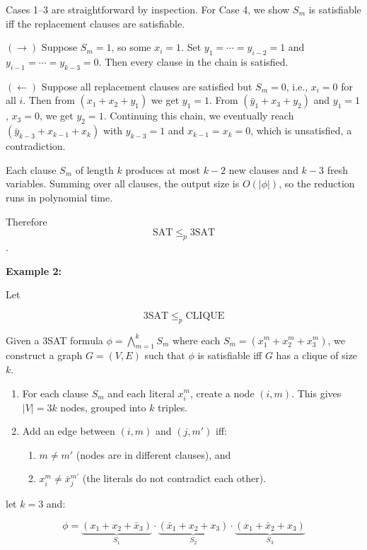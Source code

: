 \documentclass[12pt,a4paper,openany]{article}
\begin{document}
Cases 1--3 are straightforward by inspection. For Case 4, we show $S_m$ is satisfiable iff the replacement clauses are satisfiable.

$(\to)$ Suppose $S_m = 1$, so some $x_i = 1$. Set $y_1 = \cdots = y_{i-2} = 1$ and
$y_{i-1} = \cdots = y_{k-3} = 0$. Then every clause in the chain is satisfied.

$(\leftarrow)$ Suppose all replacement clauses are satisfied but $S_m = 0$, i.e., $x_i = 0$ for
all $i$. Then from $(x_1 + x_2 + y_1)$ we get $y_1 = 1$. From $(\bar{y}_1 + x_3 + y_2)$
and $y_1 = 1$, $x_3 = 0$, we get $y_2 = 1$. Continuing this chain, we eventually reach
$(\bar{y}_{k-3} + x_{k-1} + x_k)$ with $y_{k-3} = 1$ and $x_{k-1} = x_k = 0$, which is
unsatisfied, a contradiction.

Each clause $S_m$ of length $k$ produces at most $k - 2$ new clauses and
$k - 3$ fresh variables. Summing over all clauses, the output size is $O(|\phi|)$, so the
reduction runs in polynomial time.

Therefore \[\mathrm{SAT} \leq_p \mathrm{3SAT}\].

\textbf{Example 2:} 

Let

\[\mathrm{3SAT} \leq_p \mathrm{CLIQUE}\]

Given a 3SAT formula $\phi = \displaystyle\bigwedge_{m=1}^{k} S_m$ where each $S_m = (x_1^m + x_2^m + x_3^m)$,
we construct a graph $G = (V, E)$ such that $\phi$ is satisfiable iff $G$ has a clique of size $k$.


\begin{enumerate}
    \item For each clause $S_m$ and each literal $x_i^m$, create a node $(i, m)$. This gives $|V| = 3k$ nodes, grouped into $k$ triples.
    \item Add an edge between $(i, m)$ and $(j, m')$ iff:
    \begin{enumerate}
        \item $m \neq m'$ (nodes are in different clauses), and
        \item $x_i^m \neq \bar{x}_j^{m'}$ (the literals do not contradict each other).
    \end{enumerate}
\end{enumerate}

let $k = 3$ and:

\[
\phi = \underbrace{(x_1 + x_2 + \bar{x}_3)}_{S_1} \cdot \underbrace{(\bar{x}_1 + x_2 + x_3)}_{S_2} \cdot \underbrace{(x_1 + \bar{x}_2 + x_3)}_{S_3}
\]
\end{document}
